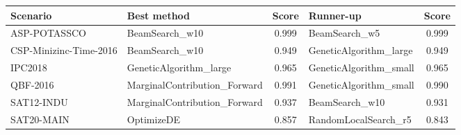 \small
\begin{tabular}{llclc}
\toprule
Scenario & Best method & Score & Runner-up & Score \\
\midrule
ASP-POTASSCO & BeamSearch\_w10 & 0.999 & BeamSearch\_w5 & 0.999 \\
CSP-Minizinc-Time-2016 & BeamSearch\_w10 & 0.949 & GeneticAlgorithm\_large & 0.949 \\
IPC2018 & GeneticAlgorithm\_large & 0.965 & GeneticAlgorithm\_small & 0.965 \\
QBF-2016 & MarginalContribution\_Forward & 0.991 & GeneticAlgorithm\_small & 0.990 \\
SAT12-INDU & MarginalContribution\_Forward & 0.937 & BeamSearch\_w10 & 0.931 \\
SAT20-MAIN & OptimizeDE & 0.857 & RandomLocalSearch\_r5 & 0.843 \\
\bottomrule
\end{tabular}
